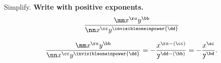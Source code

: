 








\pgfmathtruncatemacro{\nn}{-\tt*\mm}




\pgfmathtruncatemacro{\ac}{\aa-\cc}
\pgfmathtruncatemacro{\bd}{\dd-\bb}






Simplify. \textbf{Write with positive exponents.}
\[
\dfrac{\mm x^{\aa}y^{\bb}}{\nn x^{\cc}y^{\invisibleoneinpower{\dd}}}
\]


\begin{solution}
\[
\dfrac{\mm x^{\aa}y^{\bb}}{\nn x^{\cc}y^{\invisibleoneinpower{\dd}}}
=-\dfrac{x^{\aa-(\cc)}}{\tt y^{\dd-(\bb)}}
=-\dfrac{x^{\ac}}{\tt y^{\bd}}.
\]
\end{solution}